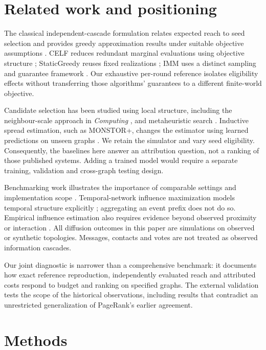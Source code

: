 \documentclass[smallextended]{svjour3}
\begin{document}
\section{Related work and positioning}
The classical independent-cascade formulation relates expected reach to seed selection and provides greedy approximation results under suitable objective assumptions \cite{ref1}. CELF reduces redundant marginal evaluations using objective structure \cite{ref7}; StaticGreedy reuses fixed realizations \cite{ref8}; IMM uses a distinct sampling and guarantee framework \cite{ref2}. Our exhaustive per-round reference isolates eligibility effects without transferring those algorithms' guarantees to a different finite-world objective.

Candidate selection has been studied using local structure, including the neighbour-scale approach in \emph{Computing} \cite{ref12}, and metaheuristic search \cite{ref13}. Inductive spread estimation, such as MONSTOR+, changes the estimator using learned predictions on unseen graphs \cite{ref19}. We retain the simulator and vary seed eligibility. Consequently, the baselines here answer an attribution question, not a ranking of those published systems. Adding a trained model would require a separate training, validation and cross-graph testing design.

Benchmarking work illustrates the importance of comparable settings and implementation scope \cite{ref16}. Temporal-network influence maximization models temporal structure explicitly \cite{ref11}; aggregating an event prefix does not do so. Empirical influence estimation also requires evidence beyond observed proximity or interaction \cite{ref15}. All diffusion outcomes in this paper are simulations on observed or synthetic topologies. Messages, contacts and votes are not treated as observed information cascades.

Our joint diagnostic is narrower than a comprehensive benchmark: it documents how exact reference reproduction, independently evaluated reach and attributed costs respond to budget and ranking on specified graphs. The external validation tests the scope of the historical observations, including results that contradict an unrestricted generalization of PageRank's earlier agreement.

\section{Methods}
\end{document}
